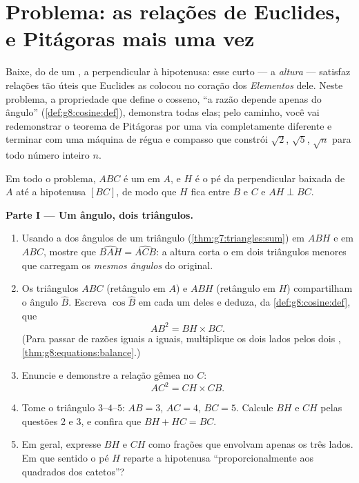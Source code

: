\section{Problema: as relações de Euclides, e Pitágoras mais uma vez}

\begin{problem}[{Problema de fim de semana --- a altura de um triângulo
retângulo: $AB^2 = BH \times BC$, $AH^2 = BH \times HC$, uma segunda
demonstração de Pitágoras e uma máquina de construir raízes
quadradas}]
\label{pb:g8:cosine:1}
Baixe, do  de um , a perpendicular à
hipotenusa: esse  curto --- a \emph{altura} --- satisfaz
relações tão úteis que Euclides as colocou no coração dos
\emph{Elementos} dele. Neste problema, a propriedade que define o
cosseno, ``a razão depende apenas do ângulo''
(\cref{def:g8:cosine:def}), demonstra todas elas; pelo caminho, você
vai redemonstrar o teorema de Pitágoras por uma via completamente
diferente e terminar com uma máquina de régua e compasso que constrói
$\sqrt2$, $\sqrt5$, $\sqrt{n}$ para todo número inteiro $n$.

Em todo o problema, $ABC$ é um  em $A$, e $H$ é o pé
da perpendicular baixada de $A$ até a hipotenusa $[BC]$, de modo que
$H$ fica entre $B$ e $C$ e $AH \perp BC$.

\medskip
\noindent\textbf{Parte I --- Um ângulo, dois triângulos.}
\begin{enumerate}
  \item Usando a  dos ângulos de um triângulo
        (\cref{thm:g7:triangles:sum}) em $ABH$ e em $ABC$, mostre que
        $\widehat{BAH} = \widehat{ACB}$: a altura corta o  em dois triângulos menores que carregam os
        \emph{mesmos ângulos} do original.
  \item Os triângulos $ABC$ (retângulo em $A$) e $ABH$ (retângulo em
        $H$) compartilham o ângulo $\widehat B$. Escreva
        $\cos\widehat B$ em cada um deles e deduza, da
        \cref{def:g8:cosine:def}, que
        \[
        AB^2 = BH \times BC .
        \]
        (Para passar de razões iguais a  iguais, multiplique os
        dois lados pelos dois ,
        \cref{thm:g8:equations:balance}.)
  \item Enuncie e demonstre a relação gêmea no  $C$:
        \[
        AC^2 = CH \times CB .
        \]
  \item Tome o triângulo $3$--$4$--$5$: $AB = 3$, $AC = 4$, $BC = 5$.
        Calcule $BH$ e $CH$ pelas questões 2 e 3, e confira que
        $BH + HC = BC$.
  \item Em geral, expresse $BH$ e $CH$ como frações que envolvam apenas
        os três lados. Em que sentido o pé $H$ reparte a hipotenusa
        ``proporcionalmente aos quadrados dos catetos''?
\end{enumerate}


\end{problem}
